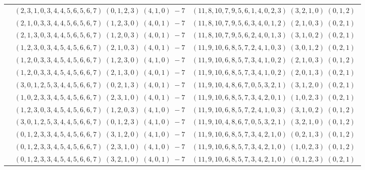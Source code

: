 \documentclass[11pt]{article}
\begin{document}
\begin{longtable}[l]{|c|c|c|}
 \cline{2-3} 
 & $(2 ,3 ,1 ,0 ,3 ,4 ,4 ,5 ,6 ,5 ,6 ,7) \;(0 ,1 ,2 ,3) \;(4 ,1 ,0) \;-7$ & $(11 ,8 ,10 ,7 ,9 ,5 ,6 ,1 ,4 ,0 ,2 ,3) \;(3 ,2 ,1 ,0) \;(0 ,1 ,2) \;$\\ 
 \cline{2-3} 
 & $(2 ,1 ,0 ,3 ,3 ,4 ,4 ,5 ,6 ,5 ,6 ,7) \;(1 ,2 ,3 ,0) \;(4 ,0 ,1) \;-7$ & $(11 ,8 ,10 ,7 ,9 ,5 ,6 ,3 ,4 ,0 ,1 ,2) \;(2 ,1 ,0 ,3) \;(0 ,2 ,1) \;$\\ 
 \cline{2-3} 
 & $(2 ,1 ,3 ,0 ,3 ,4 ,4 ,5 ,6 ,5 ,6 ,7) \;(1 ,2 ,0 ,3) \;(4 ,0 ,1) \;-7$ & $(11 ,8 ,10 ,7 ,9 ,5 ,6 ,2 ,4 ,0 ,1 ,3) \;(3 ,1 ,0 ,2) \;(0 ,2 ,1) \;$\\ 
 \cline{2-3} 
 & $(1 ,2 ,3 ,0 ,3 ,4 ,5 ,4 ,5 ,6 ,6 ,7) \;(2 ,1 ,0 ,3) \;(4 ,0 ,1) \;-7$ & $(11 ,9 ,10 ,6 ,8 ,5 ,7 ,2 ,4 ,1 ,0 ,3) \;(3 ,0 ,1 ,2) \;(0 ,2 ,1) \;$\\ 
 \cline{2-3} 
 & $(1 ,2 ,0 ,3 ,3 ,4 ,5 ,4 ,5 ,6 ,6 ,7) \;(1 ,2 ,3 ,0) \;(4 ,1 ,0) \;-7$ & $(11 ,9 ,10 ,6 ,8 ,5 ,7 ,3 ,4 ,1 ,0 ,2) \;(2 ,1 ,0 ,3) \;(0 ,1 ,2) \;$\\ 
 \cline{2-3} 
 & $(1 ,2 ,0 ,3 ,3 ,4 ,5 ,4 ,5 ,6 ,6 ,7) \;(2 ,1 ,3 ,0) \;(4 ,0 ,1) \;-7$ & $(11 ,9 ,10 ,6 ,8 ,5 ,7 ,3 ,4 ,1 ,0 ,2) \;(2 ,0 ,1 ,3) \;(0 ,2 ,1) \;$\\ 
 \cline{2-3} 
 & $(3 ,0 ,1 ,2 ,5 ,3 ,4 ,4 ,5 ,6 ,6 ,7) \;(0 ,2 ,1 ,3) \;(4 ,0 ,1) \;-7$ & $(11 ,9 ,10 ,4 ,8 ,6 ,7 ,0 ,5 ,3 ,2 ,1) \;(3 ,1 ,2 ,0) \;(0 ,2 ,1) \;$\\ 
 \cline{2-3} 
 & $(1 ,0 ,2 ,3 ,3 ,4 ,5 ,4 ,5 ,6 ,6 ,7) \;(2 ,3 ,1 ,0) \;(4 ,0 ,1) \;-7$ & $(11 ,9 ,10 ,6 ,8 ,5 ,7 ,3 ,4 ,2 ,0 ,1) \;(1 ,0 ,2 ,3) \;(0 ,2 ,1) \;$\\ 
 \cline{2-3} 
 & $(1 ,2 ,3 ,0 ,3 ,4 ,5 ,4 ,5 ,6 ,6 ,7) \;(1 ,2 ,0 ,3) \;(4 ,1 ,0) \;-7$ & $(11 ,9 ,10 ,6 ,8 ,5 ,7 ,2 ,4 ,1 ,0 ,3) \;(3 ,1 ,0 ,2) \;(0 ,1 ,2) \;$\\ 
 \cline{2-3} 
 & $(3 ,0 ,1 ,2 ,5 ,3 ,4 ,4 ,5 ,6 ,6 ,7) \;(0 ,1 ,2 ,3) \;(4 ,1 ,0) \;-7$ & $(11 ,9 ,10 ,4 ,8 ,6 ,7 ,0 ,5 ,3 ,2 ,1) \;(3 ,2 ,1 ,0) \;(0 ,1 ,2) \;$\\ 
 \cline{2-3} 
 & $(0 ,1 ,2 ,3 ,3 ,4 ,5 ,4 ,5 ,6 ,6 ,7) \;(3 ,1 ,2 ,0) \;(4 ,1 ,0) \;-7$ & $(11 ,9 ,10 ,6 ,8 ,5 ,7 ,3 ,4 ,2 ,1 ,0) \;(0 ,2 ,1 ,3) \;(0 ,1 ,2) \;$\\ 
 \cline{2-3} 
 & $(0 ,1 ,2 ,3 ,3 ,4 ,5 ,4 ,5 ,6 ,6 ,7) \;(2 ,3 ,1 ,0) \;(4 ,1 ,0) \;-7$ & $(11 ,9 ,10 ,6 ,8 ,5 ,7 ,3 ,4 ,2 ,1 ,0) \;(1 ,0 ,2 ,3) \;(0 ,1 ,2) \;$\\ 
 \cline{2-3} 
 & $(0 ,1 ,2 ,3 ,3 ,4 ,5 ,4 ,5 ,6 ,6 ,7) \;(3 ,2 ,1 ,0) \;(4 ,0 ,1) \;-7$ & $(11 ,9 ,10 ,6 ,8 ,5 ,7 ,3 ,4 ,2 ,1 ,0) \;(0 ,1 ,2 ,3) \;(0 ,2 ,1) \;$\\ 

\end{longtable}
\end{document}
